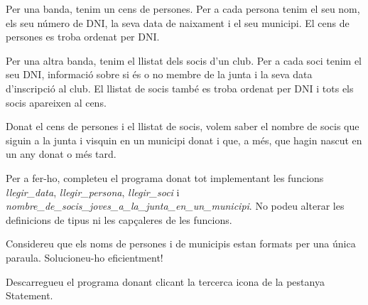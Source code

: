 

\Statement

Per una banda, tenim un cens de persones. Per a cada persona tenim el
seu nom, els seu número de DNI, la seva data de naixament i el seu municipi.
El cens de persones es troba ordenat per DNI.

\medskip

Per una altra banda, tenim el llistat dels socis d'un club. Per a cada soci tenim
el seu DNI, informació sobre si és o no membre de la junta i la  seva data
d'inscripció al club. El llistat de socis també es troba ordenat per DNI
i tots els socis apareixen al cens.

\medskip

Donat el cens de persones i el llistat de socis, volem saber el
nombre de socis que siguin a la junta i visquin en un municipi donat i que, a
més, que hagin nascut en un any donat o més tard.

\medskip

Per a fer-ho, completeu el programa donat
tot implementant les funcions
\emph{llegir\_data},
\emph{llegir\_persona},
\emph{llegir\_soci} i
\emph{nombre\_de\_socis\_joves\_a\_la\_junta\_en\_un\_municipi}.
No podeu alterar les definicions de tipus ni les capçaleres de les funcions.

\medskip

Considereu que els noms de persones i de municipis estan formats per
una única paraula. Solucioneu-ho eficientment!


Descarregueu el programa donant clicant la tercerca
icona de la pestanya Statement.

\Sample
